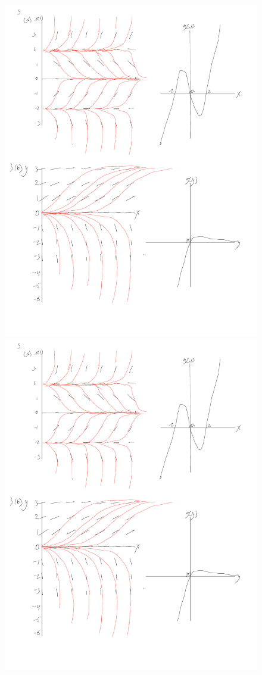 \documentclass[addpoints, 11pt]{exam}
\begin{document}
\begin{questions}
\begin{parts}
\begin{figure}[H]
		\includegraphics[page=2,scale=0.4]{Note Oct 29, 2023.pdf}
		\includegraphics[page=3,scale=0.4]{Note Oct 29, 2023.pdf}

\end{figure}
\end{parts}
\end{questions}
\end{document}
